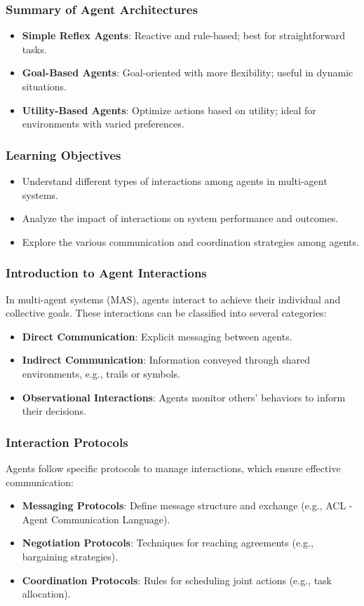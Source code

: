 \documentclass[aspectratio=169]{beamer}
\begin{document}
\begin{frame}[fragile]
    \frametitle{Summary of Agent Architectures}
    \begin{itemize}
        \item \textbf{Simple Reflex Agents}: Reactive and rule-based; best for straightforward tasks.
        \item \textbf{Goal-Based Agents}: Goal-oriented with more flexibility; useful in dynamic situations.
        \item \textbf{Utility-Based Agents}: Optimize actions based on utility; ideal for environments with varied preferences.
    \end{itemize}
\end{frame}

\begin{frame}[fragile]
    \frametitle{Learning Objectives}
    \begin{itemize}
        \item Understand different types of interactions among agents in multi-agent systems.
        \item Analyze the impact of interactions on system performance and outcomes.
        \item Explore the various communication and coordination strategies among agents.
    \end{itemize}
\end{frame}

\begin{frame}[fragile]
    \frametitle{Introduction to Agent Interactions}
    In multi-agent systems (MAS), agents interact to achieve their individual and collective goals. 
    These interactions can be classified into several categories:
    \begin{itemize}
        \item \textbf{Direct Communication}: Explicit messaging between agents.
        \item \textbf{Indirect Communication}: Information conveyed through shared environments, e.g., trails or symbols.
        \item \textbf{Observational Interactions}: Agents monitor others' behaviors to inform their decisions.
    \end{itemize}
\end{frame}

\begin{frame}[fragile]
    \frametitle{Interaction Protocols}
    Agents follow specific protocols to manage interactions, which ensure effective communication:
    \begin{itemize}
        \item \textbf{Messaging Protocols}: Define message structure and exchange (e.g., ACL - Agent Communication Language).
        \item \textbf{Negotiation Protocols}: Techniques for reaching agreements (e.g., bargaining strategies).
        \item \textbf{Coordination Protocols}: Rules for scheduling joint actions (e.g., task allocation).
    \end{itemize}
\end{frame}
\end{document}
